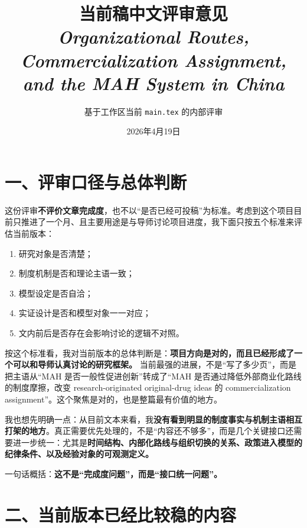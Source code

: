 \documentclass[12pt]{ctexart}
\title{\textbf{当前稿中文评审意见}\\[0.4em]
\large \textit{Organizational Routes, Commercialization Assignment, and the MAH System in China}}
\author{基于工作区当前 \texttt{main.tex} 的内部评审}
\date{2026年4月19日}
\begin{document}
\maketitle

\section*{一、评审口径与总体判断}

这份评审\textbf{不评价文章完成度}，也不以“是否已经可投稿”为标准。考虑到这个项目目前只推进了一个月、且主要用途是与导师讨论项目进度，我下面只按五个标准来评估当前版本：
\begin{enumerate}
\item 研究对象是否清楚；
\item 制度机制是否和理论主语一致；
\item 模型设定是否自洽；
\item 实证设计是否和模型对象一一对应；
\item 文内前后是否存在会影响讨论的逻辑不对照。
\end{enumerate}

按这个标准看，我对当前版本的总体判断是：\textbf{项目方向是对的，而且已经形成了一个可以和导师认真讨论的研究框架。} 当前最强的进展，不是“写了多少页”，而是把主语从“MAH 是否一般性促进创新”转成了“MAH 是否通过降低外部商业化路线的制度摩擦，改变 research-originated original-drug ideas 的 commercialization assignment”。这个聚焦是对的，也是整篇最有价值的地方。

我也想先明确一点：从目前文本来看，我\textbf{没有看到明显的制度事实与机制主语相互打架的地方}。真正需要优先处理的，不是“内容还不够多”，而是几个关键接口还需要进一步统一：尤其是\textbf{时间结构、内部化路线与组织切换的关系、政策进入模型的纪律条件、以及经验对象的可观测定义。}

一句话概括：\textbf{这不是“完成度问题”，而是“接口统一问题”。}

\section*{二、当前版本已经比较稳的内容}
\end{document}
